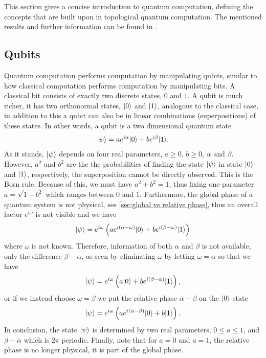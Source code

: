 \documentclass[a4paper,10pt,oneside]{book}
\theoremstyle{plain}
\theoremstyle{definition}
\theoremstyle{remark}
\DeclarePairedDelimiter\ket{\lvert}{\rangle}
\begin{document}
This section gives a concise introduction to quantum computation, defining the concepts that are built upon in topological quantum computation. The mentioned results and further information can be found in \cite{nielsen chuang}.

\subsection{Qubits} Quantum computation performs computation by manipulating qubits, similar to how classical computation performs computation by manipulating bits. A classical bit consists of exactly two discrete states, $0$ and $1$. A qubit is much richer, it has two orthonormal states, $\ket{0}$ and $\ket{1}$, analogous to the classical case, in addition to this a qubit can also be in linear combinations (superpositions) of these states. In other words, a qubit is a two dimensional quantum state
\begin{equation}
  \ket{\psi} = a e^{i\alpha} \ket{0} + b e^{i\beta} \ket{1}.
\end{equation}
As it stands, $\ket{\psi}$ depends on four real parameters, $a\ge 0$, $b\ge 0$, $\alpha$ and $\beta$. However, $a^2$ and $b^2$ are the the probabilities of finding the state $\ket{\psi}$ in state $\ket{0}$ and $\ket{1}$, respectively, the superposition cannot be directly observed. This is the Born rule. Because of this, we must have $a^2+b^2 = 1$, thus fixing one parameter $a = \sqrt{1-b^2}$ which ranges between $0$ and $1$. Furthermore, the global phase of a quantum system is not physical, see \cref{sec:global vs relative phase}, thus an overall factor $e^{i\omega}$ is not visible and we have
\begin{equation}
  \ket{\psi} = e^{i\omega}\left( a e^{i(\alpha-\omega)} \ket{0} + b e^{i(\beta-\omega)} \ket{1} \right)
\end{equation}
where $\omega$ is not known. Therefore, information of both $\alpha$ and $\beta$ is not available, only the difference $\beta-\alpha$, as seen by eliminating $\omega$ by letting $\omega = \alpha$ so that we have
\begin{equation}
  \ket{\psi} = e^{i\omega}\left( a\ket{0}+be^{i(\beta-\alpha)}\ket{1} \right),
\end{equation}
or if we instead choose $\omega = \beta$ we put the relative phase $\alpha-\beta$ on the $\ket{0}$ state
\begin{equation}
  \ket{\psi} = e^{i\omega}\left( ae^{i(\alpha-\beta)}\ket{0}+b\ket{1} \right).
\end{equation}
In conclusion, the state $\ket{\psi}$ is determined by two real parameters, $0 \le a \le 1$, and $\beta - \alpha$ which is $2\pi$ periodic. Finally, note that for $a = 0$ and $a = 1$, the relative phase is no longer physical, it is part of the global phase.
\end{document}
